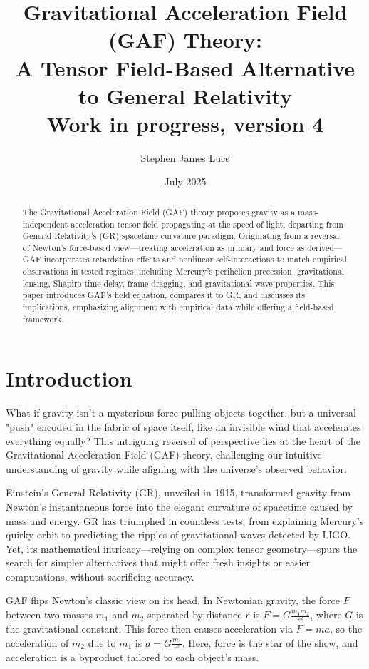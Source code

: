 \documentclass{article}
\title{Gravitational Acceleration Field (GAF) Theory: \\ A Tensor Field-Based Alternative to General Relativity \\ \small{Work in progress, version 4}}
\author{Stephen James Luce}
\date{July 2025}
\begin{document}
\maketitle

\begin{abstract}
The Gravitational Acceleration Field (GAF) theory proposes gravity as a mass-independent acceleration tensor field propagating at the speed of light, departing from General Relativity's (GR) spacetime curvature paradigm. Originating from a reversal of Newton's force-based view—treating acceleration as primary and force as derived—GAF incorporates retardation effects and nonlinear self-interactions to match empirical observations in tested regimes, including Mercury's perihelion precession, gravitational lensing, Shapiro time delay, frame-dragging, and gravitational wave properties. This paper introduces GAF's field equation, compares it to GR, and discusses its implications, emphasizing alignment with empirical data while offering a field-based framework.
\end{abstract}

\section{Introduction}

What if gravity isn't a mysterious force pulling objects together, but a universal "push" encoded in the fabric of space itself, like an invisible wind that accelerates everything equally? This intriguing reversal of perspective lies at the heart of the Gravitational Acceleration Field (GAF) theory, challenging our intuitive understanding of gravity while aligning with the universe's observed behavior.

Einstein's General Relativity (GR), unveiled in 1915, transformed gravity from Newton's instantaneous force into the elegant curvature of spacetime caused by mass and energy. GR has triumphed in countless tests, from explaining Mercury's quirky orbit to predicting the ripples of gravitational waves detected by LIGO. Yet, its mathematical intricacy—relying on complex tensor geometry—spurs the search for simpler alternatives that might offer fresh insights or easier computations, without sacrificing accuracy.

GAF flips Newton's classic view on its head. In Newtonian gravity, the force $ F $ between two masses $ m_1 $ and $ m_2 $ separated by distance $ r $ is $ F = G \frac{m_1 m_2}{r^2} $, where $ G $ is the gravitational constant. This force then causes acceleration via $ F = m a $, so the acceleration of $ m_2 $ due to $ m_1 $ is $ a = G \frac{m_1}{r^2} $. Here, force is the star of the show, and acceleration is a byproduct tailored to each object's mass.
\end{document}
